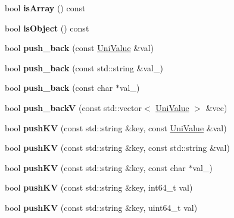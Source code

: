 \begin{DoxyCompactItemize}
bool {\bfseries is\+Array} () const
\item 
\mbox{\label{class_uni_value_af1a6df88c2bee59a863dd6f8d12e9be5}} 
bool {\bfseries is\+Object} () const
\item 
\mbox{\label{class_uni_value_a944cd1b59b040cd24c9f46b55a68d49a}} 
bool {\bfseries push\+\_\+back} (const \mbox{\hyperlink{class_uni_value}{Uni\+Value}} \&val)
\item 
\mbox{\label{class_uni_value_aac788eaa2c8b8b7849ecfc2f111e3cf2}} 
bool {\bfseries push\+\_\+back} (const std\+::string \&val\+\_\+)
\item 
\mbox{\label{class_uni_value_af2a559718c1c8e092db707a19667f9ea}} 
bool {\bfseries push\+\_\+back} (const char $\ast$val\+\_\+)
\item 
\mbox{\label{class_uni_value_ad3e16e8076509d1c8683f22df04e14d1}} 
bool {\bfseries push\+\_\+backV} (const std\+::vector$<$ \mbox{\hyperlink{class_uni_value}{Uni\+Value}} $>$ \&vec)
\item 
\mbox{\label{class_uni_value_abab649c2dbd593233de6364254456026}} 
bool {\bfseries push\+KV} (const std\+::string \&key, const \mbox{\hyperlink{class_uni_value}{Uni\+Value}} \&val)
\item 
\mbox{\label{class_uni_value_aa9330fadef9c72bb071dc8c67b5d4f42}} 
bool {\bfseries push\+KV} (const std\+::string \&key, const std\+::string \&val)
\item 
\mbox{\label{class_uni_value_aec762a3e614c9016ad0b56b5bb2a8a9f}} 
bool {\bfseries push\+KV} (const std\+::string \&key, const char $\ast$val\+\_\+)
\item 
\mbox{\label{class_uni_value_a458b225608d0a3206e1a956041f3e6ff}} 
bool {\bfseries push\+KV} (const std\+::string \&key, int64\+\_\+t val)
\item 
\mbox{\label{class_uni_value_ab828bf0d6d9bc3a9a8ff006a75a38a67}} 
bool {\bfseries push\+KV} (const std\+::string \&key, uint64\+\_\+t val)
\item 

\end{DoxyCompactItemize}
